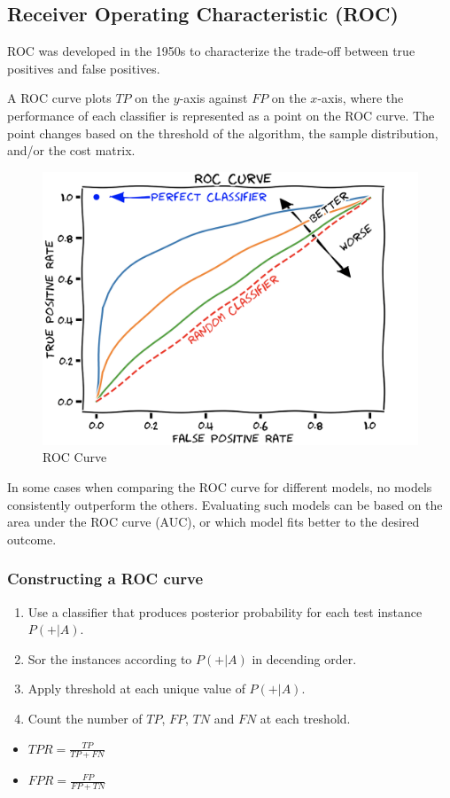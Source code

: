 \subsection{Receiver Operating Characteristic (ROC)}
ROC was developed in the 1950s to characterize the trade-off between true positives and false positives.

A ROC curve plots $TP$ on the $y$-axis against $FP$ on the $x$-axis, where the performance of each classifier is represented as a point on the ROC curve.
The point changes based on the threshold of the algorithm, the sample distribution, and/or the cost matrix.

\bigskip
\begin{figure}[H]
    \centering
    \includegraphics[scale=0.25]{figures/roccurve.png}
    \caption{ROC Curve}
\end{figure}

In some cases when comparing the ROC curve for different models, no models consistently outperform the others. Evaluating such models can be based on the area under the ROC curve (AUC), or which model fits better to the desired outcome.

\subsubsection{Constructing a ROC curve}
\begin{enumerate}
    \item Use a classifier that produces posterior probability for each test instance $P(+|A)$.
    \item Sor the instances according to $P(+|A)$ in decending order.
    \item Apply threshold at each unique value of $P(+|A)$.
    \item Count the number of $TP$, $FP$, $TN$ and $FN$ at each treshold.
\end{enumerate}
\begin{itemize}
    \item $TPR = \frac{TP}{TP+FN}$
    \item $FPR = \frac{FP}{FP+TN}$
\end{itemize}
